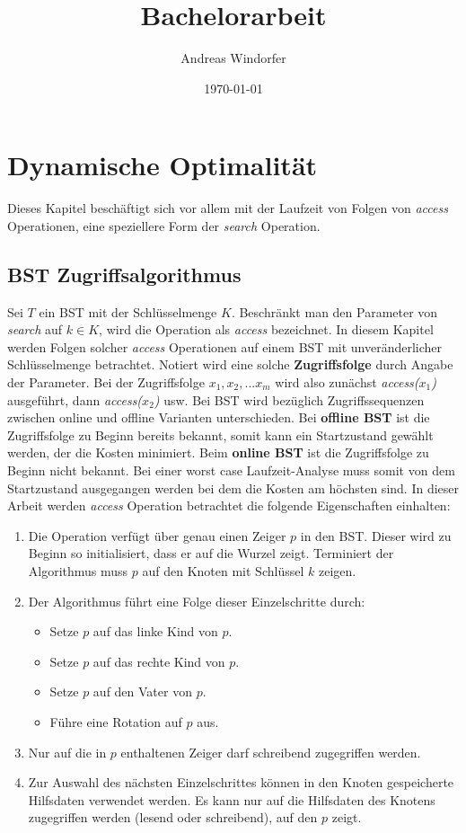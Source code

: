 \documentclass[a4paper,12pt]{article}
\title{Bachelorarbeit}
\author{
Andreas Windorfer\\
}
\date{\today}
\begin{document}
\maketitle
\newpage

\tableofcontents
\newpage

\section{Dynamische Optimalität}
Dieses Kapitel beschäftigt sich vor allem mit der Laufzeit von Folgen von \textit{access} Operationen, eine speziellere Form der \textit{search} Operation.  
\subsection{BST Zugriffsalgorithmus }
Sei $T$ ein BST mit der Schlüsselmenge $K$. Beschränkt man den Parameter von \textit{search} auf $k \in K $, wird  die Operation als \textit{access} bezeichnet. In diesem Kapitel werden Folgen solcher \textit{access} Operationen auf einem BST mit unveränderlicher Schlüsselmenge betrachtet. Notiert wird eine solche \textbf{Zugriffsfolge} durch Angabe der Parameter. Bei der Zugriffsfolge $x_1,x_2,...x_m$ wird also zunächst \textit{access($x_1$)} ausgeführt, dann \textit{access($x_2$)} usw.  Bei BST wird bezüglich Zugriffssequenzen zwischen online und offline Varianten unterschieden. Bei \textbf{offline BST} ist die Zugriffsfolge zu Beginn bereits bekannt, somit kann ein Startzustand gewählt werden, der die Kosten minimiert. Beim \textbf{online BST} ist die Zugriffsfolge zu Beginn nicht bekannt. Bei einer worst case Laufzeit-Analyse muss somit von dem Startzustand ausgegangen werden bei dem die Kosten am höchsten sind.
In dieser Arbeit werden \textit{access} Operation betrachtet die folgende Eigenschaften einhalten:

\begin{enumerate} 
	\item Die Operation verfügt über genau einen Zeiger $p$ in den BST. Dieser wird zu Beginn so initialisiert, dass er auf die Wurzel zeigt. Terminiert der Algorithmus muss $p$ auf den Knoten mit Schlüssel $k$ zeigen.
	\item Der Algorithmus führt eine Folge dieser Einzelschritte durch:
	\begin{itemize}
		\item Setze $p$ auf das linke Kind von $p$.
		\item Setze $p$ auf das rechte Kind von $p$.
		\item Setze $p$ auf den Vater von $p$.
		\item Führe eine Rotation auf $p$ aus.
	\end{itemize}  
	\item  Nur auf die in $p$ enthaltenen Zeiger darf schreibend zugegriffen werden.
	\item  Zur Auswahl des nächsten Einzelschrittes können in den Knoten gespeicherte Hilfsdaten verwendet werden. Es kann nur auf die Hilfsdaten des Knotens zugegriffen werden (lesend oder schreibend), auf den $p$ zeigt.    
\end{enumerate}
\end{document}
